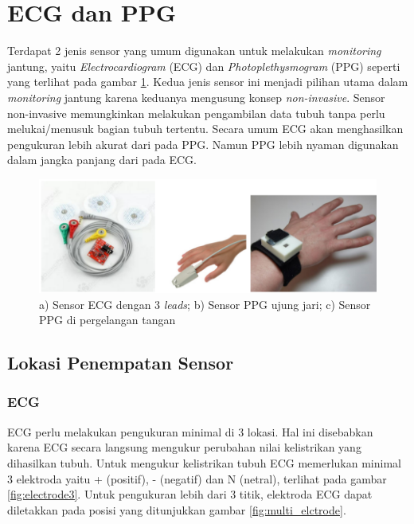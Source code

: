 \section{ECG dan PPG}
Terdapat 2 jenis sensor yang umum digunakan untuk melakukan \textit{monitoring} jantung, yaitu \textit{Electrocardiogram} (ECG) dan \textit{Photoplethysmogram} (PPG) seperti yang terlihat pada gambar \ref{fig:ecg_n_ppg}. Kedua jenis sensor ini menjadi pilihan utama dalam \textit{monitoring} jantung karena keduanya mengusung konsep \textit{non-invasive}. Sensor non-invasive memungkinkan melakukan pengambilan data tubuh tanpa perlu melukai/menusuk bagian tubuh tertentu. Secara umum ECG akan menghasilkan pengukuran lebih akurat dari pada PPG. Namun PPG lebih nyaman digunakan dalam jangka panjang dari pada ECG.

\begin{figure}[H]
    \centering
    \includegraphics[scale=0.3]{images/sensors.png}
    \caption{a) Sensor ECG dengan 3 \textit{leads}; b) Sensor PPG ujung jari; c) Sensor PPG di pergelangan tangan}
    \label{fig:ecg_n_ppg}
\end{figure}

\subsection{Lokasi Penempatan Sensor}
\subsubsection{ECG}
ECG perlu melakukan pengukuran minimal di 3 lokasi. Hal ini disebabkan karena ECG secara langsung mengukur perubahan nilai kelistrikan yang dihasilkan tubuh. Untuk mengukur kelistrikan tubuh ECG memerlukan minimal 3 elektroda yaitu + (positif), - (negatif) dan N (netral), terlihat pada gambar \ref{fig:electrode3}. Untuk pengukuran lebih dari 3 titik, elektroda ECG dapat diletakkan pada posisi yang ditunjukkan gambar \ref{fig:multi_elctrode}.

